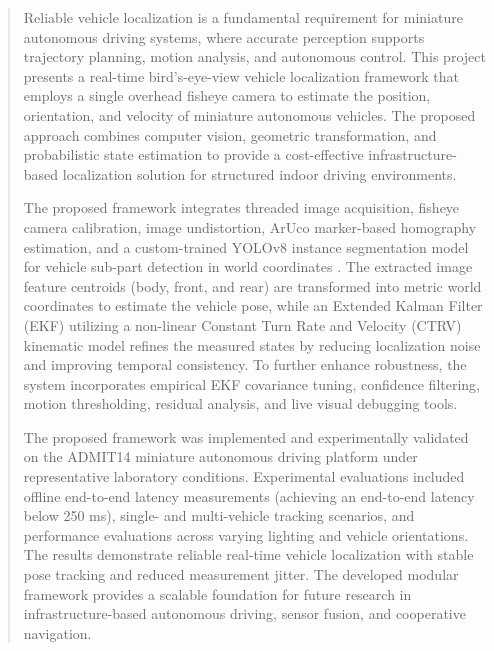 \documentclass[
11pt, %
english, %
singlespacing, %
liststotoc, %
parskip, %
nohyperref, %
consistentlayout, %
]{PSIThesis} %
\begin{document}
\begin{abstract}
	
	Reliable vehicle localization is a fundamental requirement for miniature autonomous driving systems, where accurate perception supports trajectory planning, motion analysis, and autonomous control. This project presents a real-time bird's-eye-view vehicle localization framework that employs a single overhead fisheye camera to estimate the position, orientation, and velocity of miniature autonomous vehicles. The proposed approach combines computer vision, geometric transformation, and probabilistic state estimation to provide a cost-effective infrastructure-based localization solution for structured indoor driving environments.%
	
	The proposed framework integrates threaded image acquisition, fisheye camera calibration, image undistortion, ArUco marker-based homography estimation, and a custom-trained YOLOv8 instance segmentation model for vehicle sub-part detection in world coordinates \cite{redmon2016yolo}. The extracted image feature centroids (body, front, and rear) are transformed into metric world coordinates to estimate the vehicle pose, while an Extended Kalman Filter (EKF) utilizing a non-linear Constant Turn Rate and Velocity (CTRV) kinematic model refines the measured states by reducing localization noise and improving temporal consistency. To further enhance robustness, the system incorporates empirical EKF covariance tuning, confidence filtering, motion thresholding, residual analysis, and live visual debugging tools.%
	
	The proposed framework was implemented and experimentally validated on the ADMIT14 miniature autonomous driving platform under representative laboratory conditions. Experimental evaluations included offline end-to-end latency measurements (achieving an end-to-end latency below 250 ms), single- and multi-vehicle tracking scenarios, and performance evaluations across varying lighting and vehicle orientations. The results demonstrate reliable real-time vehicle localization with stable pose tracking and reduced measurement jitter. The developed modular framework provides a scalable foundation for future research in infrastructure-based autonomous driving, sensor fusion, and cooperative navigation.
	
\end{abstract}
\end{document}
